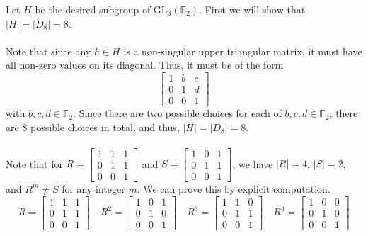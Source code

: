 \documentclass[12 pt, letterpaper]{hmcpset}
\begin{document}
\begin{solution}
	Let $H$ be the desired subgroup of $\mathrm{GL}_{3}(\mathbb{F}_{2})$. First we will show that $\lvert H \rvert = \lvert D_{8} \rvert = 8$. \\\\
	Note that since any $h \in H$ is a non-singular upper triangular matrix, it must have all non-zero values on its diagonal. Thus, it must be of the form
	\[
		\begin{bmatrix}
			1 & b & c \\
			0 & 1 & d \\
			0 & 0 & 1
		\end{bmatrix}
	\]
	with $b, c, d \in \mathbb{F}_{2}$. Since there are two possible choices for each of $b, c, d \in \mathbb{F}_{2}$, there are $8$ possible choices in total, and thus, $\lvert H \rvert = \lvert D_{8} \rvert = 8$. \\\\
	Note that for $R = 
	\begin{bmatrix}
		1 & 1 & 1 \\
		0 & 1 & 1 \\
		0 & 0 & 1
	\end{bmatrix}$ 
	and $S = 
	\begin{bmatrix}
		1 & 0 & 1 \\
		0 & 1 & 1 \\
		0 & 0 & 1
	\end{bmatrix}$, we have $\lvert R \rvert = 4$, $\lvert S \rvert = 2$, and $R^{m} \neq S$ for any integer $m$. We can prove this by explicit computation.
	\[
			R = \begin{bmatrix}
			1 & 1 & 1 \\
			0 & 1 & 1 \\
			0 & 0 & 1
			\end{bmatrix} \quad
			R^{2} = 
			\begin{bmatrix}
				1 & 0 & 1 \\
				0 & 1 & 0 \\
				0 & 0 & 1
			\end{bmatrix} \quad
			R^{3} = 
			\begin{bmatrix}
				1 & 1 & 0 \\
				0 & 1 & 1 \\
				0 & 0 & 1
			\end{bmatrix} \quad
			R^{4} = 
			\begin{bmatrix}
				1 & 0 & 0 \\
				0 & 1 & 0 \\
				0 & 0 & 1
			\end{bmatrix}
\]
\end{solution}
\end{document}
